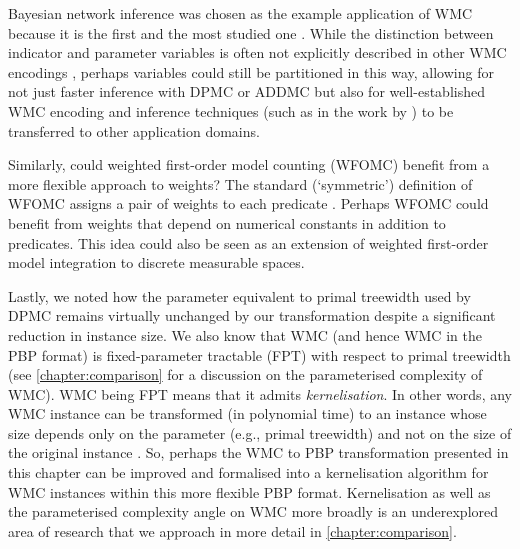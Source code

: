 Bayesian network inference was chosen as the example application of WMC because
it is the first and the most studied one
\citep{DBLP:conf/ecai/BartKLM16,DBLP:conf/ijcai/ChaviraD05,DBLP:conf/sat/ChaviraD06,DBLP:conf/kr/Darwiche02,DBLP:conf/aaai/SangBK05}.
While the distinction between indicator and parameter variables is often not
explicitly described in other WMC encodings
\citep{DBLP:journals/tplp/FierensBRSGTJR15,DBLP:journals/pacmpl/HoltzenBM20,DBLP:conf/icml/XuZFLB18},
perhaps variables could still be partitioned in this way, allowing for not just
faster inference with \textsc{DPMC} or \textsc{ADDMC} but also for
well-established WMC encoding and inference techniques (such as in the work by
\citet{DBLP:conf/ijcai/ChaviraD05,DBLP:conf/sat/ChaviraD06}) to be transferred
to other application domains.

Similarly, could weighted first-order model counting (WFOMC) benefit from a more
flexible approach to weights? The standard (`symmetric') definition of WFOMC
assigns a pair of weights to each predicate
\citep{DBLP:conf/ijcai/BroeckTMDR11}. Perhaps WFOMC could benefit from weights
that depend on numerical constants in addition to predicates. This idea could
also be seen as an extension of weighted first-order model integration
\citep{DBLP:conf/uai/FeldsteinB21} to discrete measurable spaces.

Lastly, we noted how the parameter equivalent to primal treewidth used by
\textsc{DPMC} \citep{DBLP:conf/cp/DudekPV20} remains virtually unchanged by our
transformation despite a significant reduction in instance size. We also know
that WMC (and hence WMC in the PBP format) is fixed-parameter tractable (FPT)
with respect to primal treewidth (see \cref{chapter:comparison} for a discussion
on the parameterised complexity of WMC). WMC being FPT means that it admits
\emph{kernelisation}. In other words, any WMC instance can be transformed (in
polynomial time) to an instance whose size depends only on the parameter (e.g.,
primal treewidth) and not on the size of the original instance
\citep{DBLP:series/txcs/DowneyF13}. So, perhaps the WMC to PBP transformation
presented in this chapter can be improved and formalised into a kernelisation
algorithm for WMC instances within this more flexible PBP format. Kernelisation
as well as the parameterised complexity angle on WMC more broadly is an
underexplored area of research that we approach in more detail in
\cref{chapter:comparison}.

